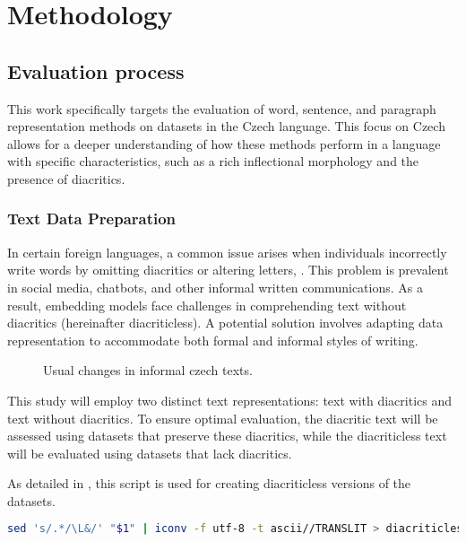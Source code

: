 
\chapter{Methodology\label{chap:methodology}}

\section{Evaluation process}

This work specifically targets the evaluation of word, sentence, and paragraph representation methods on datasets in the Czech language.
This focus on Czech allows for a deeper understanding of how these methods perform in a language with specific characteristics, such as a rich inflectional morphology and the presence of diacritics.

\subsection{Text Data Preparation}
In certain foreign languages, a common issue arises when individuals incorrectly write words by omitting diacritics or altering letters, .
This problem is prevalent in social media, chatbots, and other informal written communications.
As a result, embedding models face challenges in comprehending text without diacritics (hereinafter diacriticless). A potential solution involves adapting data representation to accommodate both formal and informal styles of writing.

\begin{figure}[h]
  \centering
  
  \caption{Usual changes in informal czech texts.}
  \label{fig:diacritics_diacriticless}
\end{figure} 

This study will employ two distinct text representations: text with diacritics and text without diacritics.
To ensure optimal evaluation, the diacritic text will be assessed using datasets that preserve these diacritics, while the diacriticless text will be evaluated using datasets that lack diacritics.

As detailed in , this script is used for creating diacriticless versions of the datasets.

\begin{lstlisting}[language=bash,basicstyle=\small\ttfamily, frame=single, caption={Script for removing diacritics using Unix utilities}, captionpos=b, label={lst:diacriticless.sh},backgroundcolor=\color{light-gray}] 
  sed 's/.*/\L&/' "$1" | iconv -f utf-8 -t ascii//TRANSLIT > diacriticless/"$1"
\end{lstlisting}


